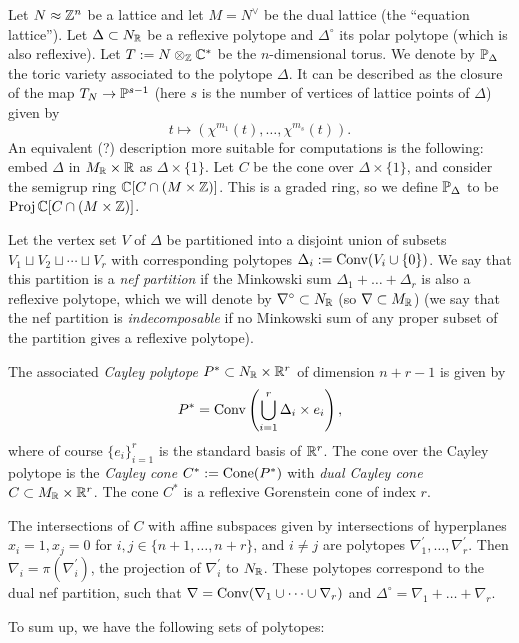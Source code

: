 \documentclass[11pt, english]{article}
\begin{document}
Let $N \approx \mathbb{Z}^n$ be a lattice and let $M=N^\vee$ be the dual lattice (the ``equation lattice''). Let $\Delta \subset N_{\mathbb{R}}$ be a reflexive polytope and $\Delta^\circ$ its polar polytope (which is also reflexive). Let $T:=N \otimes_{\mathbb{Z}} \mathbb{C}^\ast$ be the $n$-dimensional torus. We denote by $\mathbb{P}_\Delta$ the toric variety associated to the polytope $\Delta$.   It can be described as the closure of the map $T_N \to \mathbb{P}^{s-1}$ (here $s$ is the number of vertices of lattice points of $\Delta$) given by
\[
t \mapsto \left( \chi^{m_1}(t), \ldots, \chi^{m_s}(t) \right).
\]
An equivalent (?) description more suitable for computations is the following: embed $\Delta$ in $M_{\mathbb{R}} \times \mathbb{R}$ as $\Delta \times \{1\}$. Let $C$ be the cone over $\Delta \times \{1\}$, and consider the semigrup ring $\mathbb{C}[C \cap (M \times \mathbb{Z})]$. This is a graded ring, so we define $\mathbb{P}_\Delta$ to be $\operatorname{Proj} \mathbb{C}[C \cap (M \times \mathbb{Z})]$.

Let the vertex set $V$ of $\Delta$ be partitioned into a disjoint union of subsets $V_1 \sqcup V_2 \sqcup \cdots \sqcup V_r$ with corresponding polytopes $\Delta_i := \operatorname{Conv}( V_i \cup \{ 0\})$. We say that this partition is a \emph{nef partition} if the Minkowski sum $ \Delta_1 +\ldots+\Delta_r$ is also a reflexive polytope, which we will denote by $\nabla^\circ \subset N_{\mathbb{R}}$ (so $\nabla \subset M_{\mathbb{R}}$) (we say that the nef partition is \emph{indecomposable} if no Minkowski sum of any proper subset of the partition gives a reflexive polytope).

The associated \emph{Cayley polytope} $P^\ast \subset N_{\mathbb{R}} \times \mathbb{R}^r$ of dimension $n+r-1$ is given by 
\[
P^\ast = \operatorname{Conv} \left( \bigcup_{i=1}^r \Delta_i \times e_i \right),
\]
where of course $\{e_i\}_{i=1}^r$ is the standard basis of $\mathbb{R}^r$. The cone over the Cayley polytope is the \emph{Cayley cone} $C^\ast := \operatorname{Cone}(P^\ast)$ with \emph{dual Cayley cone} $C \subset M_{\mathbb{R}} \times \mathbb{R}^r$. The cone $C^\ast$ is a reflexive Gorenstein cone of index $r$.

The intersections of $C$ with affine subspaces given by intersections of hyperplanes $x_i=1,x_j=0$ for $i,j \in \{n+1,\ldots, n+r\}$, and $i\neq j$ are polytopes $\nabla_1^\prime,\ldots, \nabla_r^\prime$. Then $\nabla_i = \pi(\nabla_i^\prime)$, the projection of $\nabla_i^\prime$ to $N_{\mathbb{R}}$. These polytopes correspond to the dual nef partition, such that $\nabla = \operatorname{Conv}(\nabla_1 \cup \cdots \cup \nabla_r)$ and $\Delta^\circ = \nabla_1 + \ldots + \nabla_r$. 

To sum up, we have the following sets of polytopes:
\end{document}
